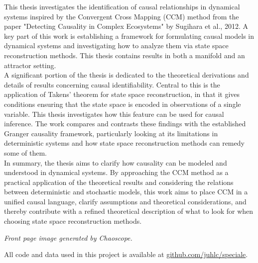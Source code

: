 \documentclass[11pt, a4paper]{memoir}
\subtitle{Convergent Cross Mapping and Alternative Approaches}
\renewenvironment{abstract}
  {\begin{oldabstract}\normalsize}  %
  {\end{oldabstract}}
\theoremstyle{break}
\theoremstyle{break}
\theoremstyle{nonumberplain}
\begin{document}
\begingroup
  \selectfont
  \maketitle
\endgroup
\frontmatter

\begin{abstract}
This thesis investigates the identification of causal relationships in dynamical systems inspired by the Convergent Cross Mapping (CCM) method from the paper "Detecting Causality in Complex Ecosystems" by Sugihara et al., 2012. A key part of this work is establishing a framework for formulating causal models in dynamical systems and investigating how to analyze them via state space reconstruction methods. This thesis contains results in both a manifold and an attractor setting.\\
A significant portion of the thesis is dedicated to the theoretical derivations and details of results concerning causal identifiability. Central to this is the application of Takens' theorem for state space reconstruction, in that it gives conditions ensuring that the state space is encoded in observations of a single variable. This thesis investigates how this feature can be used for causal inference. The work compares and contrasts these findings with the established Granger causality framework, particularly looking at its limitations in deterministic systems and how state space reconstruction methods can remedy some of them.\\
In summary, the thesis aims to clarify how causality can be modeled and understood in dynamical systems. By approaching the CCM method as a practical application of the theoretical results and considering the relations between deterministic and stochastic models, this work aims to place CCM in a unified causal language, clarify assumptions and theoretical considerations, and thereby contribute with a refined theoretical description of what to look for when choosing state space reconstruction methods.
\end{abstract}

\vfill
\textit{Front page image generated by Chaoscope.}
\newpage


\tableofcontents


\vfill
\noindent All code and data used in this project is available at \url{github.com/juhlc/speciale}.
\end{document}
